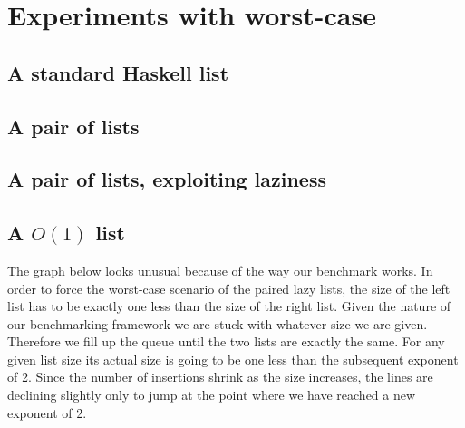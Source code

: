 \section*{Experiments with worst-case}

\subsection*{A standard Haskell list}
\subsection*{A pair of lists}
\subsection*{A pair of lists, exploiting laziness}
\subsection*{A $O(1)$ list}




The graph below looks unusual because of the way our benchmark works. In order to force the worst-case scenario of the paired lazy lists, the size of the left list has to be exactly one less than the size of the right list. Given the nature of our benchmarking framework we are stuck with whatever size we are given. Therefore we fill up the queue until the two lists are exactly the same. For any given list size its actual size is going to be one less than the subsequent exponent of 2. Since the number of insertions shrink as the size increases, the lines are declining slightly only to jump at the point where we have reached a new exponent of 2.



